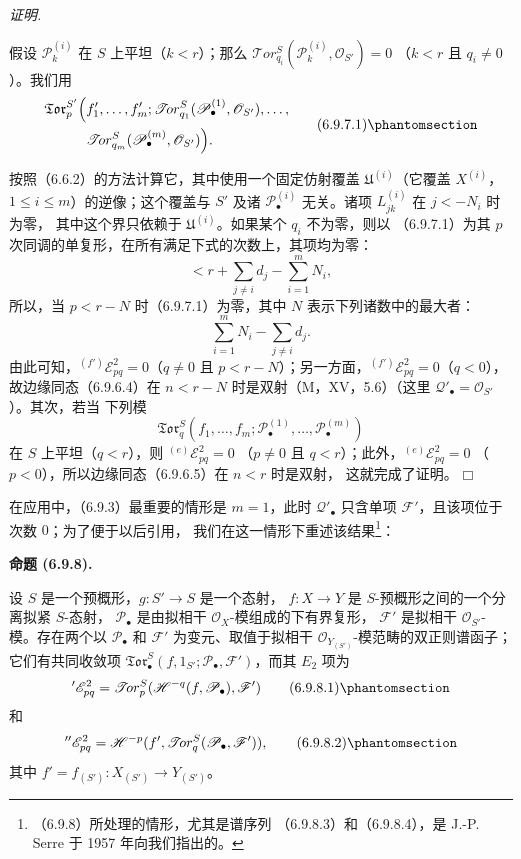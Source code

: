 \documentclass[UTF8,fontset=none,11pt,oneside,openany]{ctexbook}
\providecommand{\square}{\mdlgwhtsquare}
\newenvironment{proposition}[1][]{%
  \par\medskip\noindent\textbf{命题 (#1).}\ %
}{\par}
\newenvironment{proof}{%
  \par\smallskip\noindent\textit{证明.}\ %
}{\hfill$\square$\par}
\newcommand{\oldpage}[2][]{%
  \hypertarget{ega-source-page-#1-#2}{}%
  \marginnote{\scriptsize\textbf{#1}~|~#2}\ignorespaces}
\let\EGAOriginalLabel\label
\renewcommand{\label}[1]{\phantomsection\EGAOriginalLabel{#1}}
\begin{document}
\begin{proof}
假设 $\mathscr P_k^{(i)}$ 在 $S$ 上平坦（$k<r$）；那么
$\mathscr{T}\!or_{q_i}^S(\mathscr P_k^{(i)},\mathscr O_{S'})=0$
（$k<r$ 且 $q_i\ne0$）。我们用
\[
\begin{split}
  \mathfrak{Tor}_p^{S'}\Bigl(
  &f'_1,\ldots,f'_m;
  \mathscr{T}\!or_{q_1}^S(\mathscr P_\bullet^{(1)},\mathscr O_{S'}),
  \ldots,\\
  &\mathscr{T}\!or_{q_m}^S(\mathscr P_\bullet^{(m)},\mathscr O_{S'})
  \Bigr).
\end{split}
\tag{6.9.7.1}\label{III.6.9.7.1.fr}
\]

\oldpage[III]{170}
按照（6.6.2）的方法计算它，其中使用一个固定仿射覆盖
$\mathfrak U^{(i)}$（它覆盖 $X^{(i)}$，$1\leq i\leq m$）的逆像；这个覆盖与 $S'$ 及诸
$\mathscr P_\bullet^{(i)}$ 无关。诸项 $L_{jk}^{(i)}$ 在 $j<-N_i$ 时为零，
其中这个界只依赖于 $\mathfrak U^{(i)}$。如果某个 $q_i$ 不为零，则以
（6.9.7.1）为其 $p$ 次同调的单复形，在所有满足下式的次数上，其项均为零：
\[
  <r+\sum_{j\ne i}d_j-\sum_{i=1}^m N_i,
\]
所以，当 $p<r-N$ 时（6.9.7.1）为零，其中 $N$ 表示下列诸数中的最大者：
\[
  \sum_{i=1}^m N_i-\sum_{j\ne i}d_j.
\]
由此可知，${}^{(f')}\mathscr E_{pq}^2=0$（$q\ne0$ 且
$p<r-N$）；另一方面，${}^{(f')}\mathscr E_{pq}^2=0$（$q<0$），
故边缘同态（6.9.6.4）在 $n<r-N$
时是双射（M，XV，5.6）（这里 $\mathscr Q'_\bullet=\mathscr O_{S'}$）。其次，若当
下列模
\[
  \mathfrak{Tor}_q^S
  (f_1,\ldots,f_m;
   \mathscr P_\bullet^{(1)},\ldots,\mathscr P_\bullet^{(m)})
\]
在 $S$ 上平坦（$q<r$），则 ${}^{(e)}\mathscr E_{pq}^2=0$
（$p\ne0$ 且 $q<r$）；此外，${}^{(e)}\mathscr E_{pq}^2=0$
（$p<0$），所以边缘同态（6.9.6.5）在 $n<r$ 时是双射，
这就完成了证明。
\end{proof}

在应用中，（6.9.3）最重要的情形是 $m=1$，此时
$\mathscr Q'_\bullet$ 只含单项 $\mathscr F'$，且该项位于次数 $0$；为了便于以后引用，
我们在这一情形下重述该结果\footnote{（6.9.8）所处理的情形，尤其是谱序列
（6.9.8.3）和（6.9.8.4），是 J.-P. Serre 于 1957 年向我们指出的。}：

\begin{proposition}[6.9.8]
设 $S$ 是一个预概形，$g:S'\to S$ 是一个态射，
$f:X\to Y$ 是 $S$-预概形之间的一个分离拟紧 $S$-态射，
$\mathscr P_\bullet$ 是由拟相干 $\mathscr O_X$-模组成的下有界复形，
$\mathscr F'$ 是拟相干 $\mathscr O_{S'}$-模。存在两个以
$\mathscr P_\bullet$ 和 $\mathscr F'$ 为变元、取值于拟相干
$\mathscr O_{Y_{(S')}}$-模范畴的双正则谱函子；它们有共同收敛项
$\mathfrak{Tor}_\bullet^S(f,1_{S'};\mathscr P_\bullet,\mathscr F')$，而其
$E_2$ 项为
\[
  {}'\mathscr E_{pq}^2
  =\mathscr{T}\!or_p^S
  (\mathscr H^{-q}(f,\mathscr P_\bullet),\mathscr F')
  \tag{6.9.8.1}\label{III.6.9.8.1.fr}
\]
和
\[
  {}''\mathscr E_{pq}^2
  =\mathscr H^{-p}
  (f',\mathscr{T}\!or_q^S(\mathscr P_\bullet,\mathscr F')),
  \tag{6.9.8.2}\label{III.6.9.8.2.fr}
\]
其中 $f'=f_{(S')}:X_{(S')}\to Y_{(S')}$。
\end{proposition}
\end{document}
